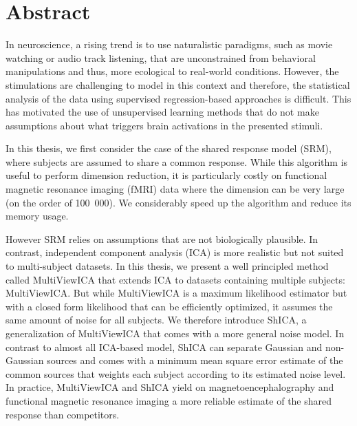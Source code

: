 \begingroup
\let\clearpage\relax
\let\cleardoublepage\relax
\let\cleardoublepage\relax

\chapter*{Abstract}
In neuroscience, a rising trend is to use naturalistic paradigms, such as movie
watching or audio track listening, that are
unconstrained from behavioral manipulations and thus, more ecological to
real-world conditions.
However, the stimulations are challenging to model in this context and therefore,
the statistical analysis of the data using supervised regression-based
approaches is difficult.
This has motivated the use of unsupervised learning methods that do not make
assumptions about what triggers brain activations in the presented stimuli.

In this thesis, we first consider the case of the shared response model (SRM), where
subjects are assumed to share a common response. While this algorithm is useful
to perform dimension reduction, it is particularly costly on functional magnetic
resonance imaging (fMRI) data where the
dimension can be very large (on the order of 100~000). We considerably speed up the
algorithm and reduce its memory usage.

However SRM relies on assumptions that are not biologically plausible. In
contrast, independent component analysis (ICA) is more realistic but not suited
to multi-subject datasets. In this thesis, we present a well principled method
called MultiViewICA that extends ICA to datasets containing multiple subjects: MultiViewICA.
But while MultiViewICA is a maximum likelihood estimator but with a closed form likelihood
that can be efficiently optimized, it assumes the same amount of noise for all
subjects.
We therefore introduce ShICA, a generalization of MultiViewICA that comes with a
more general noise model. In contrast to almost all ICA-based model, ShICA can
separate Gaussian and non-Gaussian sources and comes with a minimum mean square
error estimate of the common sources that weights each subject according to its
estimated noise level.
In practice, MultiViewICA and ShICA yield on magnetoencephalography and
functional magnetic resonance imaging a more reliable estimate
of the shared response than competitors.

